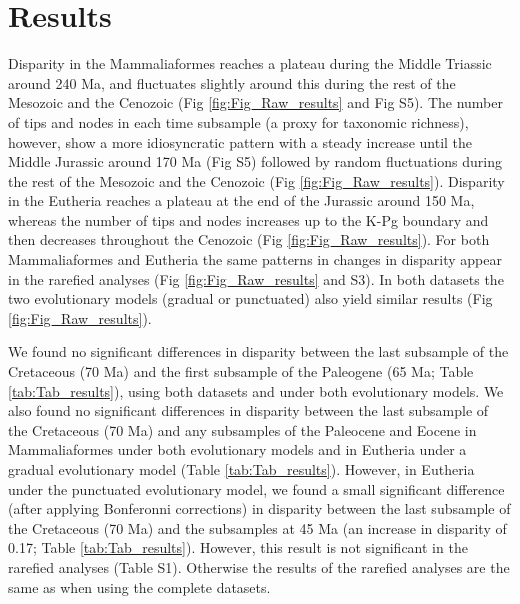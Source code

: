\documentclass[10pt,letterpaper]{article}
\begin{document}
\section*{Results}
Disparity in the Mammaliaformes reaches a plateau during the Middle Triassic around 240 Ma, and fluctuates slightly around this during the rest of the Mesozoic and the Cenozoic (Fig \ref{fig:Fig_Raw_results} and Fig S5).
The number of tips and nodes in each time subsample (a proxy for taxonomic richness), however, show a more idiosyncratic pattern with a steady increase until the Middle Jurassic around 170 Ma (Fig S5) followed by random fluctuations during the rest of the Mesozoic and the Cenozoic (Fig \ref{fig:Fig_Raw_results}).
Disparity in the Eutheria reaches a plateau at the end of the Jurassic around 150 Ma, whereas the number of tips and nodes increases up to the K-Pg boundary and then decreases throughout the Cenozoic (Fig \ref{fig:Fig_Raw_results}).
For both Mammaliaformes and Eutheria the same patterns in changes in disparity appear in the rarefied analyses (Fig \ref{fig:Fig_Raw_results} and S3).
In both datasets the two evolutionary models (gradual or punctuated) also yield similar results (Fig \ref{fig:Fig_Raw_results}).

We found no significant differences in disparity between the last subsample of the Cretaceous (70 Ma) and the first subsample of the Paleogene (65 Ma; Table \ref{tab:Tab_results}), using both datasets and under both evolutionary models. 
We also found no significant differences in disparity between the last subsample of the Cretaceous (70 Ma) and any subsamples of the Paleocene and Eocene in Mammaliaformes under both evolutionary models and in Eutheria under a gradual evolutionary model (Table \ref{tab:Tab_results}).
However, in Eutheria under the punctuated evolutionary model, we found a small significant difference (after applying Bonferonni corrections) in disparity between the last subsample of the Cretaceous (70 Ma) and the subsamples at 45 Ma (an increase in disparity of 0.17; Table \ref{tab:Tab_results}).
However, this result is not significant in the rarefied analyses (Table S1). 
Otherwise the results of the rarefied analyses are the same as when using the complete datasets. 
\end{document}
